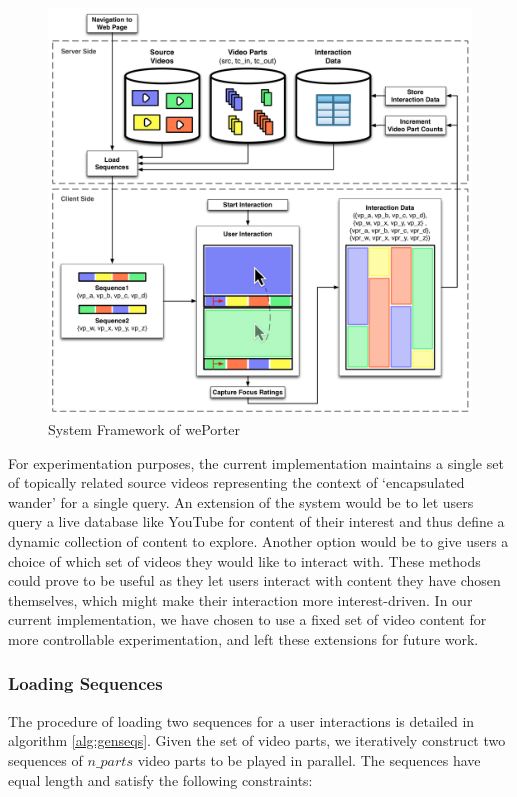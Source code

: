 \begin{figure}[htbp]
  \centering
    \includegraphics[width=\textwidth]{img/framework}
  \caption{System Framework of wePorter}
  \label{fig:framework}
\end{figure}

For experimentation purposes, the current implementation maintains a single set of topically related source videos representing the context of `encapsulated wander' for a single query. An extension of the system would be to let users query a live database like YouTube for content of their interest and thus define a dynamic collection of content to explore. Another option would be to give users a choice of which set of videos they would like to interact with. These methods could prove to be useful as they let users interact with content they have chosen themselves, which might make their interaction more interest-driven. In our current implementation, we have chosen to use a fixed set of video content for more controllable experimentation, and left these extensions for future work.


\subsubsection{Loading Sequences}
The procedure of loading two sequences for a user interactions is detailed in algorithm \ref{alg:genseqs}. Given the set of video parts, we iteratively construct two sequences of $n\_parts$ video parts to be played in parallel. The sequences have equal length and satisfy the following constraints:

